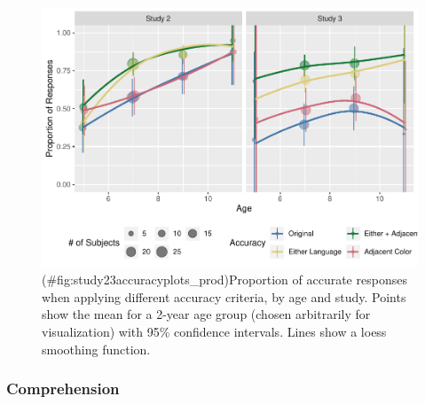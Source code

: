 \documentclass[
  english,
  ,man,floatsintext]{apa6}
\begin{document}
\begin{figure}
\centering
\includegraphics{amazon_color_files/figure-latex/study23accuracyplots_prod-1.pdf}
\caption{(\#fig:study23accuracyplots\_prod)Proportion of accurate responses when applying different accuracy criteria, by age and study. Points show the mean for a 2-year age group (chosen arbitrarily for visualization) with 95\% confidence intervals. Lines show a loess smoothing function.}
\end{figure}

\hypertarget{comprehension}{%
\subsubsection{Comprehension}\label{comprehension}}
\end{document}
